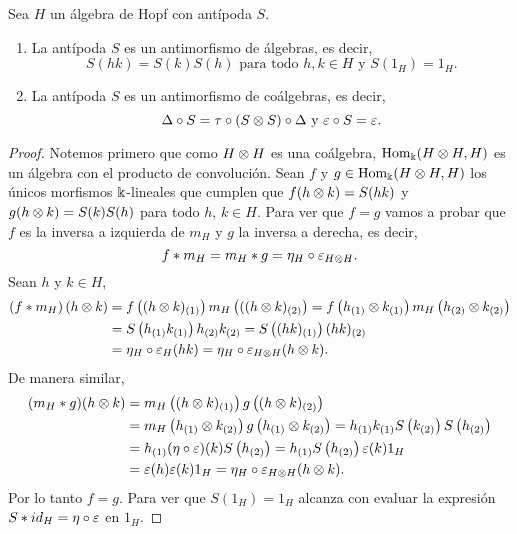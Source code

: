 \documentclass[a4paper,oneside,fleqn,11pt,../tesis.tex]{subfiles}
\begin{document}
\begin{prop} Sea $H$ un álgebra de Hopf con antípoda $S$.
	\begin{enumerate}
		\item La antípoda $S$ es un antimorfismo de álgebras, es decir,
		\[
			S(hk) = S(k)S(h) \text{ para todo }	h,k \in H \text{ y } S(1_{H}) = 1_{H}.	
		\]
		\item La antípoda $S$ es un antimorfismo de coálgebras, es decir,
		\[
			\Delta \circ S = \tau \circ	(S \otimes S) \circ \Delta \text{ y } \varepsilon \circ S = \varepsilon.	
		\]
	\end{enumerate}
\end{prop}
\begin{proof}
	Notemos primero que como $H \otimes H$ es una coálgebra, $\operatorname{Hom}_{\Bbbk}(H \otimes H, H)$ es un álgebra con el producto de convolución.
	Sean $f$ y $g \in \operatorname{Hom}_{\Bbbk}(H \otimes H, H)$ los únicos morfismos $\Bbbk$-lineales que cumplen que
	$f(h \otimes k) = S(hk)$ y $g(h \otimes k) = S(k) S(h)$ para todo $h$, $k \in H$. Para ver que $f = g$ vamos a probar que $f$ es la inversa
	a izquierda de $m_{H}$ y $g$ la inversa a derecha, es decir,
	\[
		f \ast m_{H} = m_{H} \ast g = \eta_{H} \circ \varepsilon_{H \otimes H}.
	\]
	Sean $h$ y $k \in H$,
	\begin{align*}
		\left(f \ast m_H\right)\left(h \otimes k\right) &= f\left((h \otimes k)_{(1)}\right)m_H\left(((h \otimes k)_{(2)}\right)
			= f\left(h_{(1)} \otimes k_{(1)}\right) m_{H}\left(h_{(2)} \otimes k_{(2)}\right) \\
		&= S\left(h_{(1)} k_{(1)}\right)h_{(2)}k_{(2)} = S\left((hk)_{(1)}\right)(hk)_{(2)} \\
		&= \eta_H \circ \varepsilon_{H}(hk) = \eta_{H} \circ \varepsilon_{H\otimes H} (h \otimes k). 
	\end{align*}
	De manera similar,
	\begin{align*}
		(m_{H} \ast g)(h \otimes k) &= m_{H}\left((h \otimes k)_{(1)}\right)g\left((h \otimes k)_{(2)}\right) \\
		&= m_{H}\left(h_{(1)} \otimes k_{(2)}\right)g\left(h_{(1)} \otimes k_{(2)}\right)
			= h_{(1)}k_{(1)}S\left(k_{(2)}\right)S\left(h_{(2)}\right) \\
		&= h_{(1)} (\eta \circ \varepsilon) (k) S\left(h_{(2)}\right) = h_{(1)} S\left(h_{(2)}\right) \varepsilon(k) 1_{H} \\
		&= \varepsilon(h) \varepsilon(k) 1_{H} =\eta_{H} \circ \varepsilon_{H\otimes H} (h \otimes k).
	\end{align*}
	Por lo tanto $f = g$. Para ver que $S(1_{H}) = 1_{H}$ alcanza con evaluar la expresión $S \ast id_{H} = \eta \circ \varepsilon$ en $1_{H}$.
\end{proof}
\end{document}
